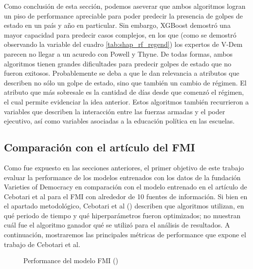 \documentclass{article}
\begin{document}
Como conclusión de esta sección, podemos aseverar que ambos algoritmos logran un piso de performance 
apreciable para poder predecir la presencia de golpes de estado en un país y año en particular. Sin 
embargo, XGBoost demostró una mayor capacidad para predecir casos complejos, en los que (como se 
demostró observando la variable del cuadro \ref{tab:shap_rf_regend}) los expertos de V-Dem parecen no 
llegar a un acuredo con Powell y Thyne. De todas formas, ambos algoritmos tienen grandes dificultades 
para predecir golpes 
de estado que no fueron exitosos. Probablemente se deba a que le dan relevancia a atributos que 
describen no sólo un golpe de estado, sino que también un cambio de régimen. El atributo que más 
sobresale es la cantidad de días desde que comenzó el régimen, el cual permite evidenciar la idea 
anterior. Estos algoritmos también recurrieron a variables que describen la interacción entre las 
fuerzas armadas y el poder ejecutivo, así como variables asociadas a la educación política en las 
escuelas.

\subsection{Comparación con el artículo del FMI}

Como fue expuesto en las secciones anteriores, el primer objetivo de este trabajo evaluar la performance
de los modelos entrenados con los datos de la fundación Varieties of Democracy en comparación con el modelo
entrenado en el artículo de Cebotari et al para el FMI con alrededor de 10 fuentes de información. Si bien
en el apartado metodológico, Cebotari et al (\citeyear{Ceb24}) describen que algoritmos utilizan, en qué periodo
de tiempo y qué hiperparámetros fueron optimizados; no muestran cuál fue el algoritmo ganador qué se utilizó
para el análisis de resultados. A continuación, mostraremos las principales métricas de performance que
expone el trabajo de Cebotari et al.

\begin{figure}[H]
 \centering
 \caption{Performance del modelo FMI (\cite{Ceb24}) \label{fig:metricas_cebotari}}
\end{figure}
\end{document}
